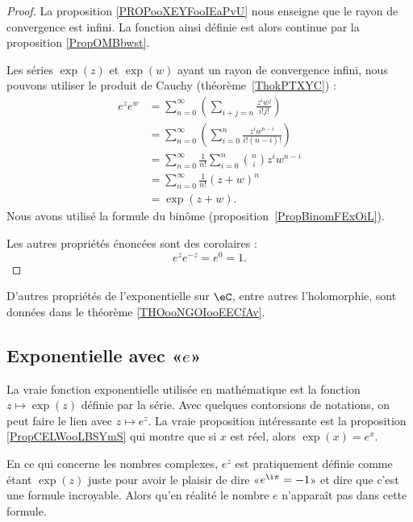 \begin{proof}
	La proposition \ref{PROPooXEYFooIEaPvU} nous enseigne que le rayon de convergence est infini. La fonction ainsi définie est alors continue par la proposition \ref{PropOMBbwst}.

	Les séries \( \exp(z)\) et \( \exp(w)\) ayant un rayon de convergence infini, nous pouvons utiliser le produit de Cauchy (théorème~\ref{ThokPTXYC}) :
	\begin{subequations}
		\begin{align}
			e^{z} e^{w} & =\sum_{n=0}^{\infty}\left( \sum_{i+j=n}\frac{ z^iw^j }{ i!j! } \right)         \\
			            & =\sum_{n=0}^{\infty}\left( \sum_{i=0}^n\frac{ z^iw^{n-i} }{ i!(n-i)! } \right) \\
			            & =\sum_{n=0}^{\infty}\frac{1}{ n! }\sum_{i=0}^{n}{n\choose i}z^iw^{n-i}         \\
			            & =\sum_{n=0}^{\infty}\frac{1}{ n! }(z+w)^{n}                                    \\
			            & =\exp(z+w).
		\end{align}
	\end{subequations}
	Nous avons utilisé la formule du binôme (proposition~\ref{PropBinomFExOiL}).

	Les autres propriétés énoncées sont des corolaires :
	\begin{equation}
		e^{z} e^{-z}= e^{0}=1.
	\end{equation}
\end{proof}

D'autres propriétés de l'exponentielle sur \( \eC\), entre autres l'holomorphie, sont données dans le théorème \ref{THOooNGOIooEECfAv}.


\subsection{Exponentielle avec «\( e\)»}

\begin{normaltext}		\label{NORMooUZZDooXUEPvT}
	La vraie fonction exponentielle utilisée en mathématique est la fonction \( z\mapsto\exp(z)\) définie par la série. Avec quelques contorsions de notations, on peut faire le lien avec \( z\mapsto e^z\). La vraie proposition intéressante est la proposition \ref{PropCELWooLBSYmS} qui montre que si \( x\) est réel, alors \( \exp(x)=e^x\).

	En ce qui concerne les nombres complexes, \( e^z\) est pratiquement définie comme étant \( \exp(z)\) juste pour avoir le plaisir de dire «\( e^{\i\pi}=-1\)» et dire que c'est une formule incroyable. Alors qu'en réalité le nombre \( e\) n'apparaît pas dans cette formule.
\end{normaltext}


